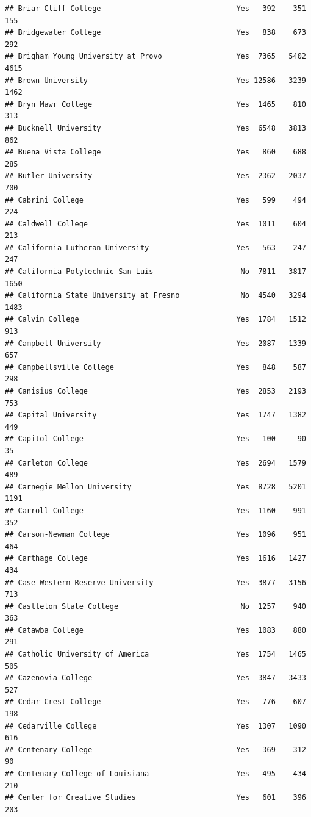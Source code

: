 \documentclass[
]{article}
\begin{document}
\begin{verbatim}
## Briar Cliff College                               Yes   392    351    155
## Bridgewater College                               Yes   838    673    292
## Brigham Young University at Provo                 Yes  7365   5402   4615
## Brown University                                  Yes 12586   3239   1462
## Bryn Mawr College                                 Yes  1465    810    313
## Bucknell University                               Yes  6548   3813    862
## Buena Vista College                               Yes   860    688    285
## Butler University                                 Yes  2362   2037    700
## Cabrini College                                   Yes   599    494    224
## Caldwell College                                  Yes  1011    604    213
## California Lutheran University                    Yes   563    247    247
## California Polytechnic-San Luis                    No  7811   3817   1650
## California State University at Fresno              No  4540   3294   1483
## Calvin College                                    Yes  1784   1512    913
## Campbell University                               Yes  2087   1339    657
## Campbellsville College                            Yes   848    587    298
## Canisius College                                  Yes  2853   2193    753
## Capital University                                Yes  1747   1382    449
## Capitol College                                   Yes   100     90     35
## Carleton College                                  Yes  2694   1579    489
## Carnegie Mellon University                        Yes  8728   5201   1191
## Carroll College                                   Yes  1160    991    352
## Carson-Newman College                             Yes  1096    951    464
## Carthage College                                  Yes  1616   1427    434
## Case Western Reserve University                   Yes  3877   3156    713
## Castleton State College                            No  1257    940    363
## Catawba College                                   Yes  1083    880    291
## Catholic University of America                    Yes  1754   1465    505
## Cazenovia College                                 Yes  3847   3433    527
## Cedar Crest College                               Yes   776    607    198
## Cedarville College                                Yes  1307   1090    616
## Centenary College                                 Yes   369    312     90
## Centenary College of Louisiana                    Yes   495    434    210
## Center for Creative Studies                       Yes   601    396    203

\end{verbatim}
\end{document}
